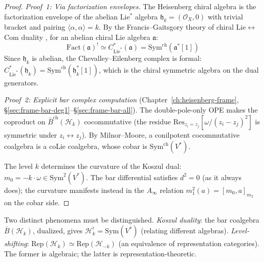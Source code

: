 \begin{proof}
\emph{Proof~1: Via factorization envelopes.}
The Heisenberg chiral algebra is the factorization envelope of the abelian Lie$^*$ algebra $\mathfrak{h}_k = (\mathcal{O}_X, 0)$ with trivial bracket and pairing $\langle \alpha, \alpha \rangle = k$. By the Francis--Gaitsgory theory of chiral Lie$\leftrightarrow$Com duality \cite{FG12}, for an abelian chiral Lie algebra $\mathfrak{a}$:
\[\mathrm{Fact}(\mathfrak{a})^! \simeq C^*_{\mathrm{Lie}^*}(\mathfrak{a}) = \mathrm{Sym}^{\mathrm{ch}}(\mathfrak{a}^*[1])\]
Since $\mathfrak{h}_k$ is abelian, the Chevalley--Eilenberg complex is formal: $C^*_{\mathrm{Lie}^*}(\mathfrak{h}_k) = \mathrm{Sym}^{\mathrm{ch}}(\mathfrak{h}_k^*[1])$, which is the chiral symmetric algebra on the dual generators.

\medskip
\emph{Proof~2: Explicit bar complex computation}
(Chapter~\ref{ch:heisenberg-frame}, \S\ref{sec:frame-bar-deg1}--\S\ref{sec:frame-bar-all}).
The double-pole-only OPE makes the coproduct on $\bar{B}^{\mathrm{ch}}(\mathcal{H}_k)$ cocommutative (the residue $\mathrm{Res}_{z_i = z_j}[\omega/(z_i - z_j)^2]$ is symmetric under $z_i \leftrightarrow z_j$).  By Milnor--Moore, a conilpotent cocommutative coalgebra is a coLie coalgebra, whose cobar is $\mathrm{Sym}^{\mathrm{ch}}(V^*)$.

The level $k$ determines the curvature of the Koszul dual: $m_0 = -k \cdot \omega \in \mathrm{Sym}^2(V^*)$.  The bar differential satisfies $d^2 = 0$ (as it always does); the curvature manifests instead in the $A_\infty$ relation $m_1^2(a) = [m_0, a]_{m_2}$ on the cobar side.
\end{proof}

\begin{remark}
Two distinct phenomena must be distinguished. \emph{Koszul duality}: the bar coalgebra $\bar{B}(\mathcal{H}_k)$, dualized, gives $\mathcal{H}_k^! = \mathrm{Sym}(V^*)$ (relating different algebras). \emph{Level-shifting}: $\mathrm{Rep}(\mathcal{H}_k) \simeq \mathrm{Rep}(\mathcal{H}_{-k})$ (an equivalence of representation categories). The former is algebraic; the latter is representation-theoretic.
\end{remark}

